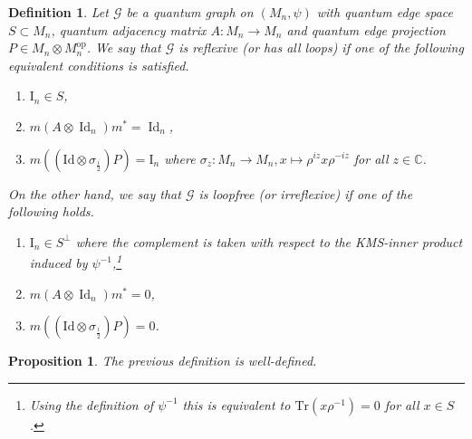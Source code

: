 \documentclass{amsart}
\newtheorem{definition}[thm]{Definition}
\newtheorem{proposition}[thm]{Proposition}
\newcommand{\Tr}{\mathrm{Tr}}
\newcommand{\C}{\mathbb{C}}
\DeclareMathOperator{\Id}{Id}
\DeclareMathOperator{\diag}{diag}
\begin{document}
\begin{definition}
\label{pre::def:(ir)reflxive_qgraphs}
    Let $\mathcal{G}$ be a quantum graph on $(M_n, \psi)$ with quantum edge space $S \subset M_n$, quantum adjacency matrix $A: M_n \to M_n$ and quantum edge projection $P \in M_n \otimes M_n^\mathrm{op}$. We say that $\mathcal{G}$ is \emph{reflexive} (or \emph{has all loops}) if one of the following equivalent conditions is satisfied.
    \begin{enumerate}
        \item $\mathrm{I}_n\in S$,
        \item $m(A\otimes\Id_n)m^\ast=\Id_n$, %
        \item $m((\mathrm{Id} \otimes \sigma_{\frac{i}{2}})P) = \mathrm{I}_n$ where $\sigma_z: M_n \to M_n, x \mapsto \rho^{iz} x \rho^{-iz}$ for all $z \in \C$.
    \end{enumerate}
    On the other hand, we say that $\mathcal{G}$ is \emph{loopfree} (or \emph{irreflexive}) if one of the following holds.
    \begin{enumerate}
        \item $\mathrm{I}_n\in S^\bot$ where the complement is taken with respect to the KMS-inner product induced by $\psi^{-1}$,\footnote{Using the definition of $\psi^{-1}$ this is equivalent to $\Tr(x \rho^{-1}) = 0$ for all $x \in S$.}
        \item $m(A\otimes\Id_n)m^\ast=0$, %
        \item $m((\mathrm{Id} \otimes \sigma_{\frac{i}{2}})P) = 0$.
    \end{enumerate}
\end{definition}


\begin{proposition}
    The previous definition is well-defined.
\end{proposition}
\end{document}
